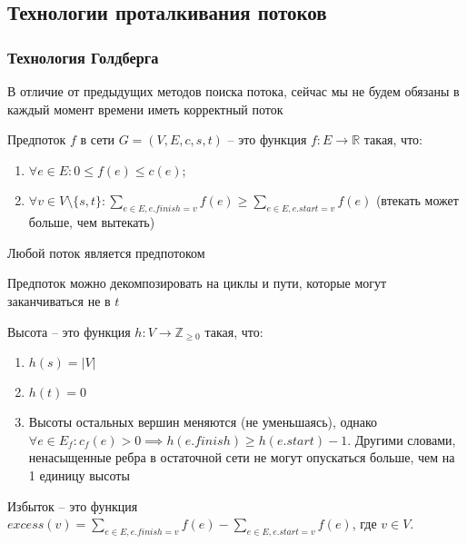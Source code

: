 \subsection{Технологии проталкивания потоков}

\subsubsection{Технология Голдберга}

\noindent В отличие от предыдущих методов поиска потока, сейчас мы не будем обязаны в каждый момент времени иметь корректный поток

\begin{definition}
    Предпоток $f$ в сети $G = (V, E, c, s, t)$ -- это функция $f: E \rightarrow \mathbb{R}$ такая, что:
    \begin{enumerate}
        \item $\forall e \in E: 0 \leq f(e) \leq c(e)$;
        \item $\forall v \in V \setminus \{s, t\}: \sum_{e \in E, e.finish = v}f(e) \geq \sum_{e \in E, e.start = v}f(e)$ (втекать может больше, чем вытекать)
    \end{enumerate}
\end{definition}

\begin{note}
    Любой поток является предпотоком
\end{note}

\begin{note}
    Предпоток можно декомпозировать на циклы и пути, которые могут заканчиваться не в $t$
\end{note}

\begin{definition}
    Высота -- это функция $h: V \rightarrow \mathbb{Z}_{\geq 0}$ такая, что:
    \begin{enumerate}
        \item $h(s) = |V|$
        \item $h(t) = 0$
        \item Высоты остальных вершин меняются (не уменьшаясь), однако $\forall e \in E_f: c_f(e) > 0 \implies h(e.finish) \geq h(e.start) - 1$. Другими словами, ненасыщенные ребра в остаточной сети не могут опускаться больше, чем на 1 единицу высоты
    \end{enumerate}
\end{definition}

\begin{definition}
    Избыток -- это функция $excess(v) = \sum_{e \in E, e.finish = v}f(e) - \sum_{e \in E, e.start = v}f(e)$, где $v \in V$. 
\end{definition}

